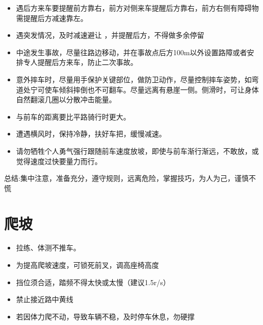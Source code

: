 \documentclass{ctexbook}
\begin{document}
\begin{itemize}
    \item 遇后方来车要提醒前方靠右，前方对侧来车提醒后方靠右，前方右侧有障碍物需提醒后方减速靠左。

    \item 遇突发情况，及时减速避让 ，并提醒后方，不得做多余停留   

    \item 中途发生事故，尽量往路边移动，并在事故点后方100m以外设置路障或者安排专人提醒后方来车，防止二次事故。

    \item 意外摔车时，尽量用手保护关键部位，做防卫动作，尽量控制摔车姿势，如弯道处宁可使车倾斜摔倒也不可翻车。尽量远离有悬崖一侧。侧滑时，可让身体自然翻滚几圈以分散冲击能量。
    \item 与前车的距离要比平路骑行时更大。
    \item 遭遇横风时，保持冷静，扶好车把，缓慢减速。

    \item 请勿牺牲个人勇气强行跟随前车速度放坡，即使与前车渐行渐远，不敢放，或觉得速度过快要量力而行。
\end{itemize}
总结:集中注意，准备充分，遵守规则，远离危险，掌握技巧，为人为己，谨慎不慌 
\section{爬坡}
\begin{itemize}
    \item 拉练、体测不推车。

    \item 为提高爬坡速度，可锁死前叉，调高座椅高度
    
    \item 挡位须合适，踏频不得太快或太慢（建议1.5r/s）

    \item 禁止接近路中黄线

    \item 若因体力爬不动，导致车辆不稳，及时停车休息，勿硬撑
\end{itemize}
\end{document}
